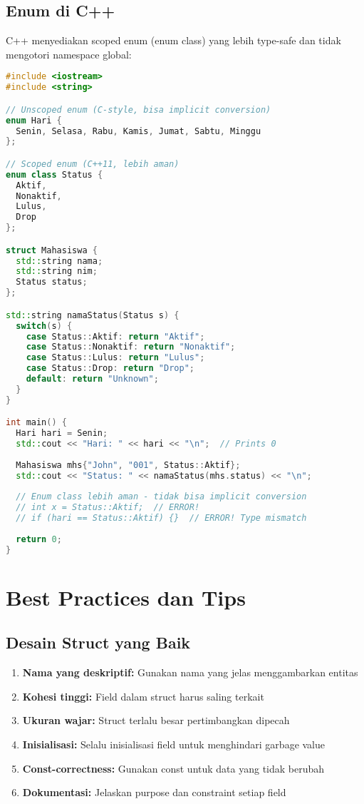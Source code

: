 \documentclass[../main.tex]{subfiles}
\begin{document}
\subsection{Enum di C++}

C++ menyediakan scoped enum (enum class) yang lebih type-safe dan tidak mengotori namespace global:

\begin{lstlisting}[language=C++, caption={Enum class di C++}]
#include <iostream>
#include <string>

// Unscoped enum (C-style, bisa implicit conversion)
enum Hari {
  Senin, Selasa, Rabu, Kamis, Jumat, Sabtu, Minggu
};

// Scoped enum (C++11, lebih aman)
enum class Status {
  Aktif,
  Nonaktif,
  Lulus,
  Drop
};

struct Mahasiswa {
  std::string nama;
  std::string nim;
  Status status;
};

std::string namaStatus(Status s) {
  switch(s) {
    case Status::Aktif: return "Aktif";
    case Status::Nonaktif: return "Nonaktif";
    case Status::Lulus: return "Lulus";
    case Status::Drop: return "Drop";
    default: return "Unknown";
  }
}

int main() {
  Hari hari = Senin;
  std::cout << "Hari: " << hari << "\n";  // Prints 0
  
  Mahasiswa mhs{"John", "001", Status::Aktif};
  std::cout << "Status: " << namaStatus(mhs.status) << "\n";
  
  // Enum class lebih aman - tidak bisa implicit conversion
  // int x = Status::Aktif;  // ERROR!
  // if (hari == Status::Aktif) {}  // ERROR! Type mismatch
  
  return 0;
}
\end{lstlisting}

\section{Best Practices dan Tips}

\subsection{Desain Struct yang Baik}

\begin{enumerate}
  \item \textbf{Nama yang deskriptif:} Gunakan nama yang jelas menggambarkan entitas
  \item \textbf{Kohesi tinggi:} Field dalam struct harus saling terkait
  \item \textbf{Ukuran wajar:} Struct terlalu besar pertimbangkan dipecah
  \item \textbf{Inisialisasi:} Selalu inisialisasi field untuk menghindari garbage value
  \item \textbf{Const-correctness:} Gunakan const untuk data yang tidak berubah
  \item \textbf{Dokumentasi:} Jelaskan purpose dan constraint setiap field
\end{enumerate}
\end{document}
